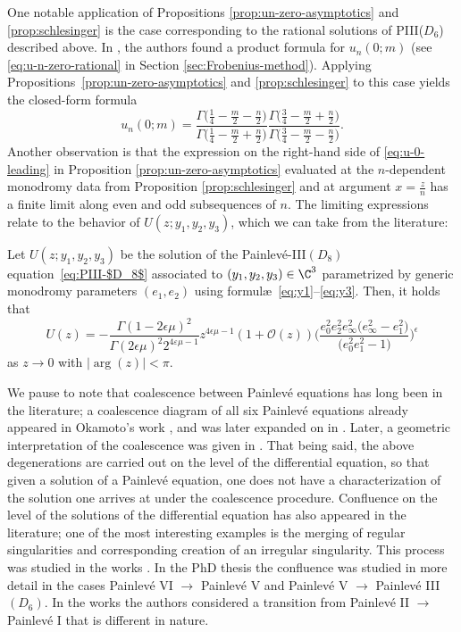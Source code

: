 One notable application of Propositions \ref{prop:un-zero-asymptotics} and \ref{prop:schlesinger} is the case corresponding to the rational solutions of PIII($D_6$) described above. In \cite{clarkson2018constructive}, the authors found a product formula for $u_n(0;m)$ (see \eqref{eq:u-n-zero-rational} in Section \ref{sec:Frobenius-method}). Applying Propositions~\ref{prop:un-zero-asymptotics} and \ref{prop:schlesinger} to this case yields the closed-form formula
\begin{equation}\label{eq:u-n-rat-leading}
u_n(0;m)=\frac{\Gamma\big(\frac{1}{4}-\frac{m}{2}-\frac{n}{2}\big)}{\Gamma \big(\frac{1}{4}-\frac{m}{2}+\frac{n}{2} \big)}\frac{\Gamma \big(\frac{3}{4}-\frac{m}{2}+\frac{n}{2} \big)}{\Gamma \big(\frac{3}{4}-\frac{m}{2}-\frac{n}{2} \big)}.
\end{equation}
Another observation is that the expression on the right-hand side of \eqref{eq:u-0-leading} in Proposition \ref{prop:un-zero-asymptotics} evaluated at the $n$-dependent monodromy data from Proposition \ref{prop:schlesinger} and at argument $x=\frac{z}{n}$ has a finite limit along even and odd subsequences of $n$. The limiting expressions relate to the behavior of $U(z;y_1,y_2,y_3)$, which we can take from the literature:
\begin{Theorem} \label{thm:D8-asymptotics-zero}
 Let $U(z;y_1,y_2,y_3)$ be the solution of the Painlev\'e-{\rm III}$(D_8)$ equation~\eqref{eq:PIII-$D_8$} associated to $(y_1,y_2,y_3) \in \C^3$ parametrized by generic monodromy parameters $(e_1,e_2)$ using formul\ae\ \eqref{eq:y1}--\eqref{eq:y3}. Then, it holds that
 \begin{equation*}
 U(z) = -\frac{ \Gamma (1 - 2\epsilon \mu)^2 }{\Gamma (2\epsilon \mu )^2 2^{4\varepsilon\mu-1} } z^{4 \epsilon \mu - 1} (1 + \mathcal{O}(z) )\Bigg(\dfrac{e_{0}^2 e_2^2 e_{\infty}^2 \big(e_{\infty}^2-e_{1}^2\big)}{
 \big(e_{0}^2 e_{1}^2-1\big)}\Bigg)^{\epsilon}
 \end{equation*}
 as $z\to 0$ with $|{\arg}(z)|<\pi$.
\end{Theorem}
We pause to note that coalescence between Painlev\'e equations has long been in the literature; a coalescence diagram of all six Painlev\'e equations already appeared in Okamoto's work \cite{O1}, and was later expanded on in \cite{OO}. Later, a geometric interpretation of the coalescence was given in \cite{CMR}. That being said, the above degenerations are carried out on the level of the differential equation, so that given a solution of a Painlev\'e equation, one does not have a characterization of the solution one arrives at under the coalescence procedure. Confluence on the level of the solutions of the differential equation has also appeared in the literature; one of the most interesting examples is the merging of regular singularities and corresponding creation of an irregular singularity. This process was studied in the works \cite{Glutsuk,Kitaev06}. In the PhD thesis \cite{Horrobin} the confluence was studied in more detail in the cases Painlev\'e VI $\to$ Painlev\'e V and Painlev\'e V $\to$ Painlev\'e III$(D_6)$. In the works \cite{Kapaev94,Kapaev_Kitaev} the authors considered a transition from Painlev\'e II $\to$ Painlev\'e I that is different in nature.

